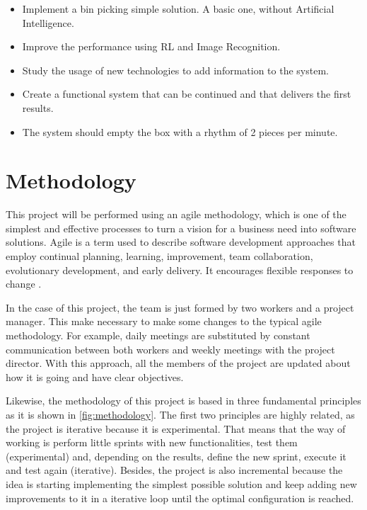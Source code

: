 		\begin{itemize}
			\item[\textendash]Implement a bin picking simple solution. A basic one, without Artificial Intelligence.
			\item[\textendash]Improve the performance using RL and Image Recognition.
			\item[\textendash]Study the usage of new technologies to add information to the system. 
			\item[\textendash]Create a functional system that can be continued and that delivers the first results.
			\item[\textendash]The system should empty the box with a rhythm of 2 pieces per minute.
		\end{itemize}
	
	\section{Methodology}
		This project will be performed using an agile methodology, which is one of the simplest and effective processes to turn a vision for a business need into software solutions. Agile is a term used to describe software development approaches that employ continual planning, learning, improvement, team collaboration, evolutionary development, and early delivery. It encourages flexible responses to change \cite{noauthor_agile_nodate}.
		
		In the case of this project, the team is just formed by two workers and a project manager. This make necessary to make some changes to the typical agile methodology. For example, daily meetings are substituted by constant communication between both workers and weekly meetings with the project director. With this approach, all the members of the project are updated about how it is going and have clear objectives.
		
		Likewise, the methodology of this project is based in three fundamental principles as it is shown in \autoref{fig:methodology}. The first two principles are highly related, as the project is iterative because it is experimental. That means that the way of working is perform little sprints with new functionalities, test them (experimental) and, depending on the results, define the new sprint, execute it and test again (iterative). Besides, the project is also incremental because the idea is starting implementing the simplest possible solution and keep adding new improvements to it in a iterative loop until the optimal configuration is reached.
		
